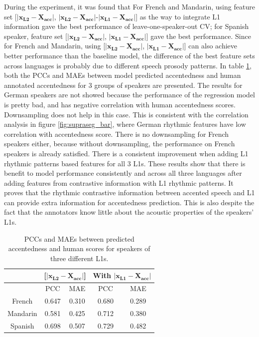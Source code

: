 During the experiment, it was found that For French and Mandarin, using feature set [$\left| \mathbf{x_{L2}}-\mathbf{X_{acc}} \right|$, $\left| \mathbf{x_{L2}}-\mathbf{X_{acc}} \right|$-$\left| \mathbf{x_{L1}}- \mathbf{X_{acc}} \right|$] as the way to integrate L1 information gave the best performance of leave-one-speaker-out CV; for Spanish speaker, feature set [$\left| \mathbf{x_{L2}}-\mathbf{X_{acc}} \right|$, $\left| \mathbf{x_{L1}}- \mathbf{X_{acc}} \right|$] gave the best performance. Since for French and Mandarin, using [$\left| \mathbf{x_{L2}}-\mathbf{X_{acc}} \right|$, $\left| \mathbf{x_{L1}}- \mathbf{X_{acc}} \right|$] can also achieve better performance than the baseline model, the difference of the best feature sets across languages is probably due to different speech prosody patterns.
In table \ref{table:supraseg_pred}, both the PCCs and MAEs between model predicted accentedness and human annotated accentedness for 3 groups of speakers are presented. The results for German speakers are not showed because the performance of the regression model is pretty bad, and has negative correlation with human accentedness scores. Downsampling does not help in this case. This is consistent with the correlation analysis in figure \ref{fig:supraseg_bar}, where German rhythmic features have low correlation with accentedness score. There is no downsampling for French speakers either, because without downsampling, the performance on French speakers is already satisfied. There is a consistent improvement when adding L1 rhythmic patterns based features for all 3 L1s. These results show that there is benefit to model performance consistently and across all three languages after adding features from contrastive information with L1 rhythmic patterns. It proves that the rhythmic contrastive information between accented speech and L1 can provide extra information for accentedness prediction. This is also despite the fact that the annotators know little about the acoustic properties of the speakers' L1s.

\begin{table}[]
\centering
\caption{PCCs and MAEs between predicted accentedness and human scores for speakers of three different L1s.}
\label{table:supraseg_pred}
\begin{tabular}{|c|c|c|c|c|}
\hline
 & \multicolumn{2}{c|}{[$\left| \mathbf{x_{L2}}-\mathbf{X_{acc}} \right|$]} & \multicolumn{2}{c|}{With $\left| \mathbf{x_{L1}}- \mathbf{X_{acc}} \right|$} \\ \hline
 & PCC & MAE & PCC & MAE \\ \hline
French & 0.647 & 0.310 & 0.680 & 0.289 \\ \hline
Mandarin & 0.581 & 0.425 & 0.712 & 0.380 \\ \hline
Spanish & 0.698 & 0.507 & 0.729 & 0.482 \\ \hline
\end{tabular}
\end{table}

